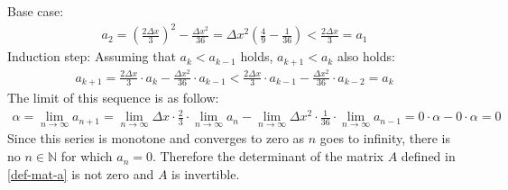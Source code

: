 Base case:
\begin{gather}
a_{2} = (\frac{2 \Delta x}{3})^{2} - \frac{\Delta x^{2}}{36} = \Delta x^{2} (\frac{4}{9} - \frac{1}{36}) < \frac{2 \Delta x}{3} = a_{1}
\end{gather}
Induction step: Assuming that \(a_k < a_{k-1}\) holds, \(a_{k+1} < a_{k}\) also holds:
\begin{gather}
a_{k+1} = \frac{2 \Delta x}{3} \cdot a_{k} - \frac{\Delta x^2}{36} \cdot a_{k-1}  < \frac{2 \Delta x}{3} \cdot a_{k-1} - \frac{\Delta x^2}{36} \cdot a_{k-2} = a_{k} 
\end{gather}
The limit of this sequence is as follow:
\begin{gather}
\alpha = \lim_{n \to \infty} a_{n+1} = \lim_{n \to \infty} \Delta x \cdot \frac{2}{3} \cdot \lim_{n \to \infty} a_{n} - \lim_{n \to \infty} \Delta x^{2} 
\cdot \frac{1}{36} \cdot \lim_{n \to \infty} a_{n-1} 
= 0 \cdot \alpha - 0 \cdot \alpha = 0
\end{gather}
Since this series is monotone and converges to zero as \(n\) goes to infinity, there is no \(n \in \mathbb{N}\) for which \(a_n = 0\). 
Therefore the determinant of the matrix \(A\) defined in \ref{def-mat-a} is not zero and \(A\) is invertible.





